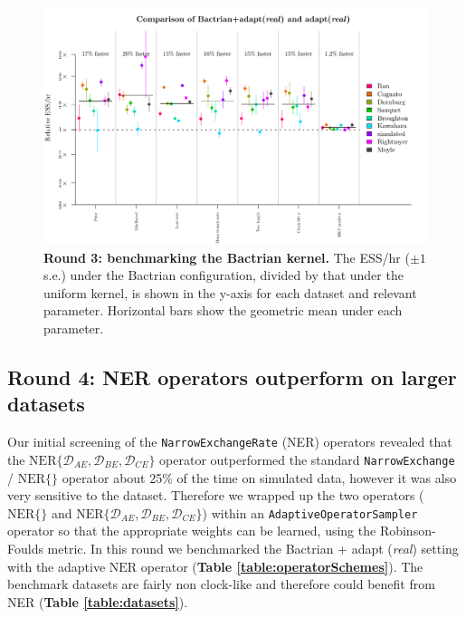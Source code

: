 \documentclass[10pt,letterpaper]{article}
\begin{document}
\begin{figure}[!h]
\includegraphics[width=\textwidth]{benchmarking/benchmarkingVM/ESS_round3.pdf}
\caption{\textbf{Round 3: benchmarking the Bactrian kernel.}
The ESS/hr ($\pm 1$ s.e.) under the Bactrian configuration, divided by that under the uniform kernel, is shown in the y-axis for each dataset and relevant parameter.
Horizontal bars show the geometric mean under each parameter.
 }
\label{fig:round3Results}
\end{figure}




\subsection*{Round 4: NER operators outperform on larger datasets}


Our initial screening of the \texttt{NarrowExchangeRate} (NER) operators revealed that the $\text{NER}\{\mathcal{D}_{AE}, \mathcal{D}_{BE}, \mathcal{D}_{CE}\}$ operator outperformed the standard  \texttt{NarrowExchange} / $\text{NER} \{\}$ operator about 25\% of the time on simulated data, however it was also very sensitive to the dataset. 
Therefore we wrapped up the two operators ($\text{NER} \{\}$ and $\text{NER}\{\mathcal{D}_{AE}, \mathcal{D}_{BE}, \mathcal{D}_{CE}\}$) within an \texttt{AdaptiveOperatorSampler} operator so that the appropriate weights can be learned, using the Robinson-Foulds metric.
In this round we benchmarked the Bactrian + adapt (\textit{real}) setting with the adaptive $\text{NER}$ operator (\textbf{Table \ref{table:operatorSchemes}}).
The benchmark datasets are fairly non clock-like and therefore could benefit from NER (\textbf{Table \ref{table:datasets}}).   
\end{document}
